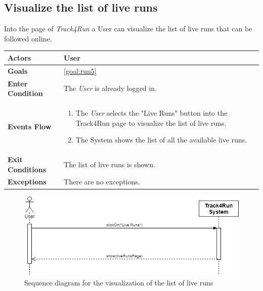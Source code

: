  \subsection{Visualize the list of live runs}
Into the page of \emph{Track4Run} a User can visualize the list of live runs that can be followed online.

\begin{table}[H]
	\centering
    
    \begin{tabular}{|p{3.5cm}|p{10.3cm}|}
    
    \hline
    \textbf{\large{Actors}}  			& \tabitem User 	\\
    				 					
    \hline
    \textbf{\large{Goals}} 				& \ref{goal:run5}\\
    
    \hline
    \textbf{\large{Enter Condition}}	& The \emph{User} is already logged in.		\\
    
    \hline
    \textbf{\large{Events Flow}}		& \begin{enumerate}[leftmargin=0.5cm]
                                          	\item The \emph{User} selects the "Live Runs" button into the Track4Run page to visualize the list of live runs.
                                          	 \item The System shows the list of all the available live runs.
                                          \end{enumerate}
    										\\
    \hline
    \textbf{\large{Exit Conditions}}    & The list of live runs is shown.\\
    
    \hline
    \textbf{\large{Exceptions}} 		& There are no exceptions.\\
    
    \hline
    
    
    \end{tabular}
	
\end{table}

\begin{figure}[H]
    \centering
    \includegraphics[scale=0.4]{Pictures/visListLiveRunsSeqDiag.png}
    \caption{Sequence diagram for the visualization of the list of live runs}
\end{figure}
